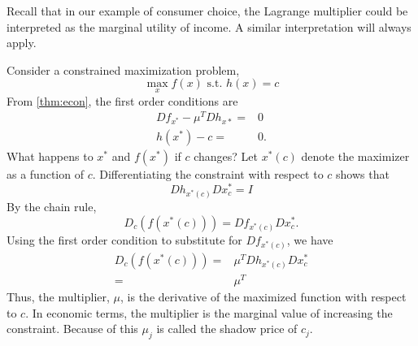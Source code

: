 Recall that in our example of consumer choice, the Lagrange multiplier
could be interpreted as the marginal utility of income.  A similar
interpretation will always apply. 

Consider a constrained maximization problem,
\[ \max_{x} f(x) \text{ s.t. } h(x) = c \]
From \ref{thm:econ}, the first order conditions are
\begin{align*}
 Df_{x^*} - \mu^T Dh_{x*} = & 0 \\
 h(x^*) - c = & 0.
\end{align*}
What happens to $x^*$ and $f(x^*)$ if $c$ changes? Let $x^*(c)$ denote
the maximizer as a function of $c$. Differentiating the constraint
with respect to $c$ shows that
\[ Dh_{x^*(c)} Dx^*_c = I \]
By the chain rule,
\[ D_c \left( f(x^*(c)) \right) = Df_{x^*(c)} Dx^*_c. \] 
Using the first order condition to substitute for $Df_{x^*(c)}$, we
have
\begin{align*}
  D_c \left( f(x^*(c)) \right) = & \mu^T Dh_{x^*(c)} Dx^*_c \\
  = & \mu^T 
\end{align*}
Thus, the multiplier, $\mu$, is the derivative of the maximized
function with respect to $c$.  In economic terms, the multiplier is
the marginal value of increasing the constraint. Because of this
$\mu_j$ is called the shadow price of $c_j$. 

